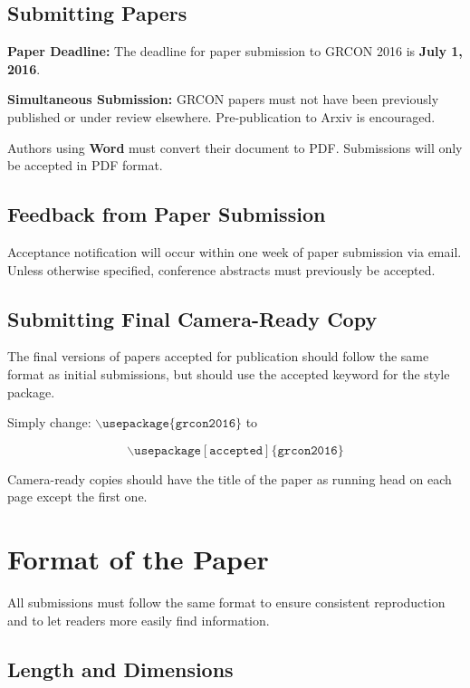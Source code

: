 \documentclass{article}
\begin{document}
\subsection{Submitting Papers}

{\bf Paper Deadline:} The deadline for paper submission to GRCON 2016
is \textbf{July 1, 2016}. 

{\bf Simultaneous Submission:} GRCON papers must not have been previously 
published or under review elsewhere.  Pre-publication to Arxiv is encouraged.

\medskip

Authors using \textbf{Word} must convert their document to PDF.  
Submissions will only be accepted in PDF format.

\subsection{Feedback from Paper Submission}

Acceptance notification will occur within one week of paper submission via email.
Unless otherwise specified, conference abstracts must previously be accepted.

\subsection{Submitting Final Camera-Ready Copy}

The final versions of papers accepted for publication should follow the
same format as initial submissions, but should use the accepted keyword 
for the style package.

Simply change:
$\mathtt{\backslash usepackage\{grcon2016\}}$ to 

$$\mathtt{\backslash usepackage[accepted]\{grcon2016\}}$$

\noindent

Camera-ready copies should have the title of the paper as running head
on each page except the first one.  

\section{Format of the Paper} 
 
All submissions must follow the same format to ensure consistent reproduction
and to let readers more easily find information.

\subsection{Length and Dimensions}
\end{document}
